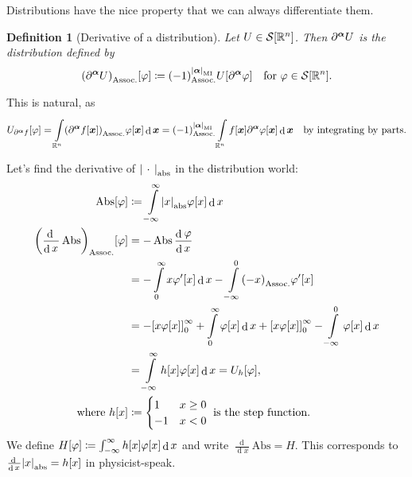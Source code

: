 \documentclass[10pt]{article}
\newtheorem*{definition}{Definition}
\DeclarePairedDelimiter\singleBars{\lvert}{\rvert}
\DeclarePairedDelimiter\parentheses{\lparen}{\rparen}
\DeclarePairedDelimiter\squareBrackets{[}{]}
\DeclareMathOperator{\AbsDistrib}{Abs}
\DeclareMathOperator{\diffd}{d}
\newcommand{\der}{'}
\newcommand\deriv[3][]{\frac{\diffd^{#1} {#3}}{{\diffd {#2}}^{#1}}}
\newcommand{\derivop}[2][]{\deriv[#1]{#2}{}}
\newcommand{\pdop}[1]{\partial^{#1}}
\newcommand{\R}{\mathbb{R}}
\newcommand{\SchwartzSpace}{\mathcal{S}}
\newcommand\of[1]{\parentheses*{#1}}
\newcommand\pa[1]{\parentheses*{#1}}
\newcommand\abs[1]{\singleBars*{#1}}
\newcommand\total[1]{\singleBars*{#1}}
\newcommand{\diff}[3]{\squareBrackets*{#3}_{#1}^{#2}}
\newcommand\gj\varphi
\newcommand{\vx}{{\vectorsym x}}
\newcommand{\miga}{{\vectorsym \alpha}}
\newcommand\placeholder{\,\:\cdot\:\,}
\renewcommand\pa[1]{\parentheses*{#1}_\mathrm{Assoc.}}
\renewcommand\of[1]{\squareBrackets*{#1}}
\renewcommand\total[1]{\singleBars*{#1}_{\mathrm{MI}}}
\renewcommand\abs[1]{\singleBars*{#1}_{\mathrm{abs}}}
\newcommand{\Rn}{{\R^n}}
\newcommand{\Schwartz}{{\SchwartzSpace\of{\Rn}}}
\begin{document}
  Distributions have the nice property that we can always differentiate them.
  \begin{definition}[Derivative of a distribution]
    Let $U\in\Schwartz$. Then $\pdop\miga U$ is the distribution defined
    by 
    \begin{equation*}
      \pa{\pdop\miga U}\of{\gj} \coloneqq \pa{-1}^{\total{\miga}} U\of{\pdop\miga\gj}\quad
      \text{for }\gj \in \Schwartz.
    \end{equation*}
  \end{definition}
      This is natural, as
  \begin{align*}
    U_{\pdop\miga f}\of\gj 
    = \int\Rn\pa{\pdop\miga f\of\vx} \gj\of\vx \diffd{\vx} 
    = \pa{-1}^{\total{\miga}} \int\Rn f\of\vx \partial^\miga \gj\of\vx \diffd{\vx} 
    && \text{by integrating by parts.}
  \end{align*}

  Let's find the derivative of $\abs{\placeholder}$ in the distribution world:
  \begin{align*}
    \AbsDistrib\of\gj &\coloneqq \int{-\infty}[\infty] \abs{x} \gj\of{x} \diffd{x}\\
    \pa{\derivop x \AbsDistrib}\of\gj &= - \AbsDistrib  \deriv x \gj\\
    &= - \int0[\infty] x \gj\der\of{x} \diffd{x} - \int{-\infty}[0]\pa{-x}\gj\der\of{x} \\
    &= - \diff 0 \infty {x \gj\of{x}} + \int0[\infty] \gj\of{x} \diffd{x} + 
    \diff 0 \infty {x \gj\of{x}} - \int{-\infty}[0] \gj\of{x} \diffd{x} \\
    &= \int{-\infty}[\infty] h\of{x} \gj\of{x} \diffd{x} = U_h\of\gj,\\
    \text{where } h\of{x} &\coloneqq
	\begin{cases}
		1  & x \geq 0 \\
		-1 & x < 0
	\end{cases}
    \text{ is the step function}.
  \end{align*}
We define $H\of\gj \coloneqq \int{-\infty}[\infty] h\of{x} \gj\of{x} \diffd{x}$ and write $\derivop x \mathrm{Abs} = H$. This corresponds to $\derivop x \abs{x} = h\of{x}$ in physicist-speak.
\end{document}
